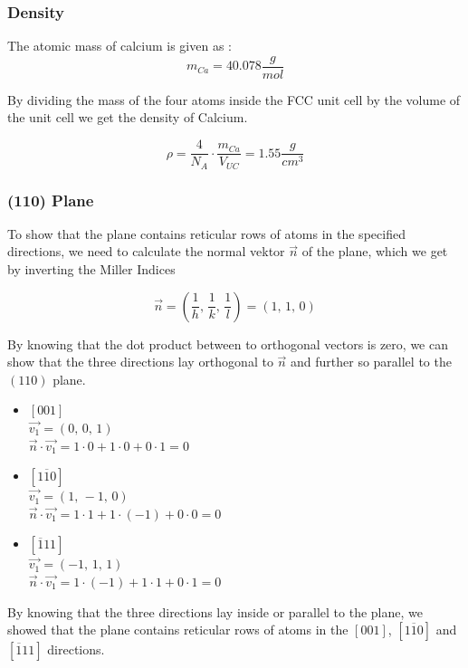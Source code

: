 \subsubsection*{Density}

The atomic mass of calcium is given as \cite{lenntech_chemical_elements}:
$$m_{Ca} = 40.078 \frac{g}{mol}$$

By dividing the mass of the four atoms inside the FCC unit cell by the volume of the
unit cell we get the density of Calcium.

$$\rho = \frac{4}{N_A} \cdot \frac{m_{Ca}}{V_{UC}} = 1.55 \frac{g}{cm^3}$$

\subsubsection*{(110) Plane}

To show that the plane contains reticular rows of atoms in the specified
directions, we need to calculate the normal
vektor $\vec{n}$ of the plane, which we get by inverting the Miller Indices

$$\vec{n} = (\frac{1}{h} ,\, \frac{1}{k} ,\, \frac{1}{l}) = (1, \, 1,\, 0)$$

By knowing that the dot product between to orthogonal vectors is zero, we can show
that the three directions lay orthogonal to $\vec{n}$ and further so parallel
to the $(110)$ plane.

\begin{itemize}
	\item 	$[001]$\\
			$\vec{v_1} = (0, \, 0,\, 1)$\\
			$\vec{n} \cdot \vec{v_1} = 1 \cdot 0 + 1 \cdot 0 + 0 \cdot 1 = 0$
\end{itemize}
\begin{itemize}
	\item 	$[1\overline{1}0]$\\
			$\vec{v_1} = (1, \, -1,\, 0)$\\
			$\vec{n} \cdot \vec{v_1} = 1 \cdot 1 + 1 \cdot (-1) + 0 \cdot 0 = 0$
\end{itemize}
\begin{itemize}
	\item 	$[\overline{1}11]$\\
			$\vec{v_1} = (-1, \, 1,\, 1)$\\
			$\vec{n} \cdot \vec{v_1} = 1 \cdot (-1) + 1 \cdot 1 + 0 \cdot 1 = 0$
\end{itemize}

By knowing that the three directions lay inside or parallel to the plane, we
showed that the plane contains reticular rows of atoms in the $[001]$, $[1\overline{1}0]$
and $[\overline{1}11]$ directions.

